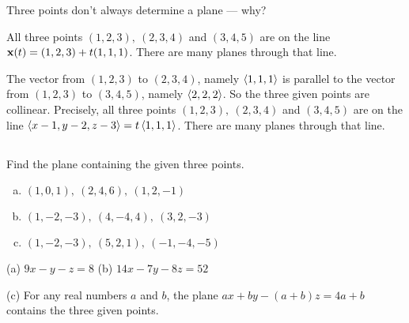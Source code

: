 \begin{hint}
Three points don't always determine a plane --- why?
\end{hint}

\begin{answer}
 All three points $(1,2,3),\ (2,3,4)$ and $(3,4,5)$
are on the line $\mathbf{x}(t)=(1,2,3)+t(1,1,1)$. There are many planes
through that line.
\end{answer}

\begin{solution}
The vector from $(1,2,3)$ to $(2,3,4)$, namely $\left< 1,1,1\right>$
is parallel to the vector from $(1,2,3)$ to $(3,4,5)$, namely
$\left< 2,2,2\right>$. So the three given points are collinear. Precisely,
 all three points $(1,2,3),\ (2,3,4)$ and $(3,4,5)$
are on the line $\left< x-1,y-2,z-3\right>=t\left< 1,1,1\right>$. There are many planes
through that line.
\end{solution}


\subsection*{\Procedural}

\begin{question}
Find the plane containing the given three points.
\begin{enumerate}[(a)]
\item
$(1,0,1),\ (2,4,6),\ (1,2,-1)$
\item
$(1,-2,-3),\ (4,-4,4),\ (3,2,-3)$
\item
$(1,-2,-3),\ (5,2,1),\ (-1,-4,-5)$ 
\end{enumerate}
\end{question}

%

\begin{answer}
(a) $9x-y-z=8$ \qquad
(b) $14x-7y-8z=52$ 

(c) For any real numbers $a$ and $b$, the plane  
$ax+by-(a+b)z=4a+b$ contains the three given points. 

\end{answer}

